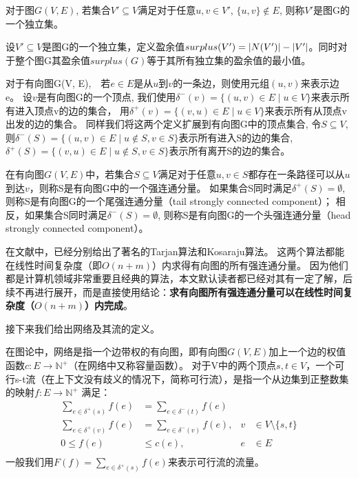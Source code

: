 \begin{definition}[独立集]
对于图$G(V, E)$, 若集合$V' \subseteq V$满足对于任意$u, v \in V'$, $\{u, v\} \notin E$, 则称$V'$是图G的一个独立集。
\end{definition}

设$V' \subseteq V$是图G的一个独立集，定义盈余值$surplus(V') = \left\vert N(V') \right\vert - \left\vert V' \right\vert$。同时对于整个图G其盈余值$surplus(G)$等于其所有独立集的盈余值的最小值。

对于有向图G(V, E),　若$e \in E$是从$u$到$v$的一条边，则使用元组$(u, v)$来表示边e。
设$v$是有向图G的一个顶点, 我们使用$\delta^-(v)=\{(u, v) \in E\;|\;u \in V\}$来表示所有进入顶点v的边的集合，
用$\delta^+(v)=\{(v, u) \in E\;|\;u \in V\}$来表示所有从顶点v出发的边的集合。
同样我们将这两个定义扩展到有向图G中的顶点集合, 令$S \subseteq V$,
则$\delta^-(S)=\{(u, v) \in E\;|\;u \notin S, v \in S\}$表示所有进入S的边的集合,
$\delta^+(S)=\{(v, u) \in E\;|\; u \notin S, v \in S\}$表示所有离开S的边的集合。

\begin{definition}
在有向图$G(V, E)$中，若集合$S \subseteq V$满足对于任意$u, v \in S$都存在一条路径可以从$u$到达$v$，则称S是有向图G中的一个强连通分量。
如果集合S同时满足$\delta^+(S) = \emptyset$, 则称S是有向图G的一个尾强连通分量（tail strongly connected component）；
相反，如果集合S同时满足$\delta^-(S) = \emptyset$, 则称S是有向图G的一个头强连通分量（head strongly connected component）。
\end{definition}

在文献\cite{tarjan1972depth,sharir1981strong}中，已经分别给出了著名的Tarjan算法和Kosaraju算法。
这两个算法都能在线性时间复杂度（即$O(n + m)$）内求得有向图的所有强连通分量。
因为他们都是计算机领域非常重要且经典的算法，本文默认读者都已经对其有一定了解，后续不再进行展开，而是直接使用结论：\textbf{求有向图所有强连通分量可以在线性时间复杂度（$O(n + m)$）内完成}。

接下来我们给出网络及其流的定义。

在图论中，网络是指一个边带权的有向图，即有向图$G(V, E)$加上一个边的权值函数$c: E \rightarrow \mathbb{N}^+$（在网络中又称容量函数）。
对于V中的两个顶点$s, t \in V$，一个可行s-t流（在上下文没有歧义的情况下，简称可行流），是指一个从边集到正整数集的映射$f: E \rightarrow \mathbb{N}^+$ 满足：
\begin{equation} \label{EquationFlow} \begin{aligned}
  \sum_{e\in \delta^+(s)}{f(e)}&=\sum_{e\in \delta^-(t)}{f(e)}& \\
  \sum_{e\in \delta^+(v)}{f(e)}&=\sum_{e\in \delta^-(v)}{f(e)}, & v &\in V \setminus \{s, t\} \\
  0 \le f(e) &\le c(e), & e &\in E \\
\end{aligned} \end{equation}
一般我们用$F(f)=\sum_{e\in \delta^+(s)}{f(e)}$来表示可行流的流量。

